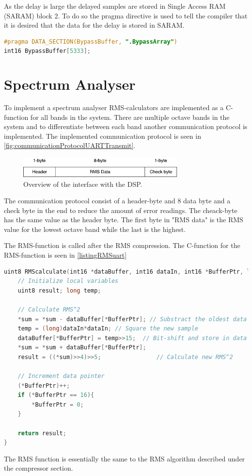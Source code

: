 As the delay is large the delayed samples are stored in Single Access RAM (SARAM) block 2. To do so the pragma directive is used to tell the compiler that it is desired that the data for the delay is stored in SARAM.

\begin{lstlisting}[language=C, caption = {Pragma for delay buffer for bypass.},label={listingPragma}]
#pragma DATA_SECTION(BypassBuffer, ".BypassArray")
int16 BypassBuffer[5333];
\end{lstlisting}


\section{Spectrum Analyser}

To implement a spectrum analyser RMS-calculators are implemented as a C-function for all bands in the system. There are multiple octave bands in the system and to differentiate between each band another communication protocol is implemented. The implemented communication protocol is seen in \autoref{fig:communicationProtocolUARTTransmit}.

\begin{figure}[H]
\centering
\includegraphics[width=0.75\textwidth]{figures/communicationProtocolUARTTransmit.pdf}
\caption{Overview of the interface with the DSP.}
\label{fig:communicationProtocolUARTTransmit}
\end{figure}

The communication protocol consist of a header-byte and 8 data byte and a check byte in the end to reduce the amount of error readings. The cheack-byte has the same value as the header byte. The first byte in "RMS data" is the RMS value for the lowest octave band while the last is the highest.

The RMS-function is called after the RMS compression. The C-function for the RMS-function is seen in \autoref{listingRMSuart}

\begin{lstlisting}[language=C, caption = {Calculate RMS value},label={listingRMSuart}]
uint8 RMScalculate(int16 *dataBuffer, int16 dataIn, int16 *BufferPtr, long *sum){
	// Initialize local variables
	uint8 result; long temp;
	
	// Calculate RMS^2
	*sum = *sum - dataBuffer[*BufferPtr]; // Substract the oldest data from sum
	temp = (long)dataIn*dataIn;	// Square the new sample
	dataBuffer[*BufferPtr] = temp>>15;	// Bit-shift and store in data buffer
	*sum = *sum + dataBuffer[*BufferPtr];
	result = ((*sum)>>4)>>5;				// Calculate new RMS^2
	
	// Increment data pointer
	(*BufferPtr)++;
	if (*BufferPtr == 16){ 
		*BufferPtr = 0;
	}
	
	return result;
}
\end{lstlisting}

The RMS function is essentially the same to the RMS algorithm described under the compressor section.


